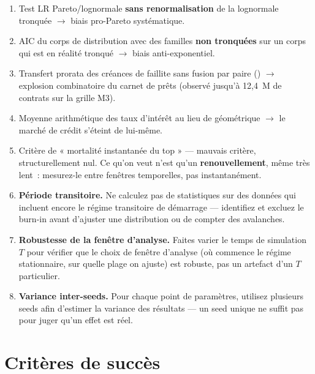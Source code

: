 \begin{enumerate}[leftmargin=*]
  \item Test LR Pareto/lognormale \textbf{sans renormalisation} de la
    lognormale tronquée $\rightarrow$ biais pro-Pareto systématique.
  \item AIC du corps de distribution avec des familles \textbf{non
    tronquées} sur un corps qui est en réalité tronqué $\rightarrow$ biais
    anti-exponentiel.
  \item Transfert prorata des créances de faillite sans fusion par paire
    () $\rightarrow$ explosion combinatoire du carnet de
    prêts (observé jusqu'à 12,4~M de contrats sur la grille M3).
  \item Moyenne arithmétique des taux d'intérêt au lieu de géométrique
    $\rightarrow$ le marché de crédit s'éteint de lui-même.
  \item Critère de « mortalité instantanée du top » — mauvais critère,
    structurellement nul. Ce qu'on veut n'est qu'un \textbf{renouvellement},
    même très lent~: mesurez-le entre fenêtres temporelles, pas
    instantanément.
  \item \textbf{Période transitoire.} Ne calculez pas de statistiques sur
    des données qui incluent encore le régime transitoire de démarrage —
    identifiez et excluez le burn-in avant d'ajuster une distribution ou de
    compter des avalanches.
  \item \textbf{Robustesse de la fenêtre d'analyse.} Faites varier le temps
    de simulation $T$ pour vérifier que le choix de fenêtre d'analyse (où
    commence le régime stationnaire, sur quelle plage on ajuste) est
    robuste, pas un artefact d'un $T$ particulier.
  \item \textbf{Variance inter-seeds.} Pour chaque point de paramètres,
    utilisez plusieurs seeds afin d'estimer la variance des résultats — un
    seed unique ne suffit pas pour juger qu'un effet est réel.
\end{enumerate}

\section*{Critères de succès}

